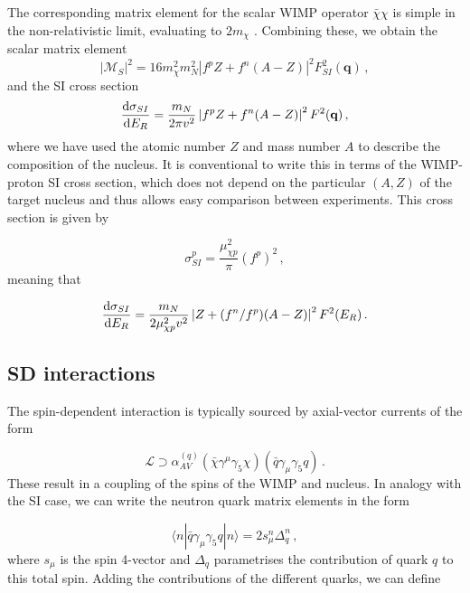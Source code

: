 The corresponding matrix element for the scalar WIMP operator $\bar{\chi}\chi$ is simple in the non-relativistic limit, evaluating to $2 m_\chi$ \cite{Jungman:1995}. Combining these, we obtain the scalar matrix element
\begin{equation}
|\mathcal{M}_S|^2 = 16 m_\chi^2 m_N^2 \left|f^p Z + f^n (A-Z)\right|^2 F_{SI}^2(\textbf{q})\,,
\end{equation}
and the SI cross section
\begin{equation}
\frac{\mathrm{d}\sigma_{SI}}{\mathrm{d}E_R} = \frac{m_N}{ 2 \pi v^2} \left|f^p Z + f^n (A-Z)\right|^2 F^2(\textbf{q})\,,
\end{equation}
where we have used the atomic number $Z$ and mass number $A$ to describe the composition of the nucleus. It is conventional to write this in terms of the WIMP-proton SI cross section, which does not depend on the particular $(A,Z)$ of the target nucleus and thus allows easy comparison between experiments. This cross section is given by

\begin{equation}
\sigma_{SI}^p = \frac{\mu_{\chi p}^2}{\pi}(f^p)^2\,,
\end{equation}
meaning that

\begin{equation}
\frac{\mathrm{d}\sigma_{SI}}{\mathrm{d}E_R} = \frac{m_N}{ 2 \mu_{\chi p}^2 v^2} \left|Z + (f^n/f^p) (A-Z)\right|^2 F^2(E_R)\,.
\end{equation}

\subsection{SD interactions}

The spin-dependent interaction is typically sourced by axial-vector currents of the form

\begin{equation}
\label{eq:AVInt}
\mathcal{L} \supset \alpha_{AV}^{(q)} (\bar{\chi} \gamma^\mu \gamma_5 \chi) (\bar{q} \gamma_\mu \gamma_5 q)\,.
\end{equation}
These result in a coupling of the spins of the WIMP and nucleus. In analogy with the SI case, we can write the neutron quark matrix elements in the form \cite{Engel:1991, Engel:1992}

\begin{equation}
\langle n | \bar{q} \gamma_\mu \gamma_5 q | n \rangle = 2 s_\mu^n \Delta_q^n\,,
\end{equation}
where $s_\mu$ is the spin 4-vector and $\Delta_q$ parametrises the contribution of quark $q$ to this total spin. Adding the contributions of the different quarks, we can define


